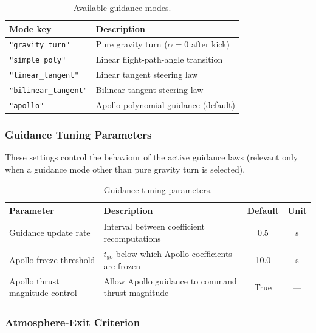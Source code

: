 \begin{table}[htbp]
  \centering
  \caption{Available guidance modes.}
  \label{tab:param_guidance_mode}
  \begin{tabular}{l l}
    \toprule
    \textbf{Mode key} & \textbf{Description} \\
    \midrule
    \texttt{"gravity\_turn"}     & Pure gravity turn ($\alpha = 0$ after kick) \\
    \texttt{"simple\_poly"}      & Linear flight-path-angle transition \\
    \texttt{"linear\_tangent"}   & Linear tangent steering law \\
    \texttt{"bilinear\_tangent"} & Bilinear tangent steering law \\
    \texttt{"apollo"}            & Apollo polynomial guidance (default) \\
    \bottomrule
  \end{tabular}
\end{table}

\subsubsection{Guidance Tuning Parameters}

These settings control the behaviour of the active guidance laws (relevant
only when a guidance mode other than pure gravity turn is selected).

\begin{table}[htbp]
  \centering
  \caption{Guidance tuning parameters.}
  \label{tab:param_guidance_tune}
  \begin{tabular}{l l c c}
    \toprule
    \textbf{Parameter} & \textbf{Description} & \textbf{Default} & \textbf{Unit} \\
    \midrule
    Guidance update rate
      & Interval between coefficient recomputations
      & 0.5  & s \\
    Apollo freeze threshold
      & $t_{\text{go}}$ below which Apollo coefficients are frozen
      & 10.0 & s \\
    Apollo thrust magnitude control
      & Allow Apollo guidance to command thrust magnitude
      & True & --- \\
    \bottomrule
  \end{tabular}
\end{table}

\subsubsection{Atmosphere-Exit Criterion}

